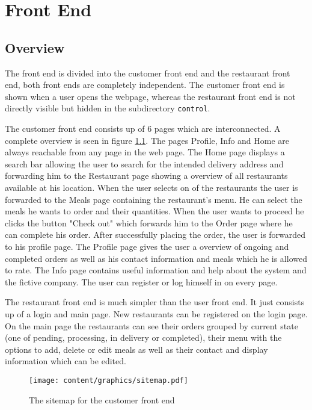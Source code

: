 \chapter{Front End}

\section{Overview}
The front end is divided into the customer front end and the restaurant front end, both front ends are completely independent. The customer front end is shown when a user opens the webpage, whereas the restaurant front end is not directly visible but hidden in the subdirectory \texttt{control}.

The customer front end consists up of 6 pages which are interconnected. A complete overview is seen in figure \ref{front_end_sitemap}. The pages Profile, Info and Home are always reachable from any page in the web page. The Home page displays a search bar allowing the user to search for the intended delivery address and forwarding him to the Restaurant page showing a overview of all restaurants available at his location. When the user selects on of the restaurants the user is forwarded to the Meals page containing the restaurant's menu. He can select the meals he wants to order and their quantities. When the user wants to proceed he clicks the button "Check out" which forwards him to the Order page where he can complete his order. After successfully placing the order, the user is forwarded to his profile page. The Profile page gives the user a overview of ongoing and completed orders as well as his contact information and meals which he is allowed to rate. The Info page contains useful information and help about the system and the fictive company. The user can register or log himself in on every page. 

The restaurant front end is much simpler than the user front end. It just consists up of a login and main page. New restaurants can be registered on the login page. On the main page the restaurants can see their orders grouped by current state (one of pending, processing, in delivery or completed), their menu with the options to add, delete or edit meals as well as their contact and display information which can be edited.

\begin{figure}
\texttt{[image: content/graphics/sitemap.pdf]}
\caption{The sitemap for the customer front end}
\label{front_end_sitemap}
\end{figure}

